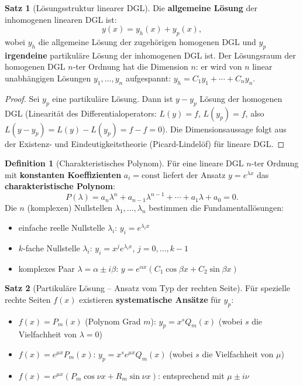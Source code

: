 ﻿\documentclass[a4paper,12pt]{report}
\theoremstyle{definition}
\newtheorem{definition}{Definition}
\newtheorem{satz}{Satz}
\begin{document}
\begin{satz}[L\"osungsstruktur linearer DGL]
Die \textbf{allgemeine L\"osung} der inhomogenen linearen DGL ist:
\[
  y(x) = y_h(x) + y_p(x),
\]
wobei $y_h$ die allgemeine L\"osung der zugeh\"origen homogenen DGL
und $y_p$ \textbf{irgendeine} partikul\"are L\"osung der inhomogenen DGL ist.
Der L\"osungsraum der homogenen DGL $n$-ter Ordnung hat die Dimension $n$:
er wird von $n$ linear unabh\"angigen L\"osungen $y_1, \ldots, y_n$ aufgespannt:
$y_h = C_1 y_1 + \cdots + C_n y_n$.
\end{satz}
\begin{proof}
Sei $y_p$ eine partikul\"are L\"osung. Dann ist $y - y_p$ L\"osung der
homogenen DGL (Linearit\"at des Differentialoperators: $L(y) = f$,
$L(y_p) = f$, also $L(y - y_p) = L(y) - L(y_p) = f - f = 0$).
Die Dimensionsaussage folgt aus der Existenz- und Eindeutigkeitstheorie
(Picard-Lindel\"of) f\"ur lineare DGL.
\end{proof}

\begin{definition}[Charakteristisches Polynom]
F\"ur eine lineare DGL $n$-ter Ordnung mit \textbf{konstanten Koeffizienten}
$a_i = \mathrm{const}$ liefert der Ansatz $y = e^{\lambda x}$
das \textbf{charakteristische Polynom}:
\[
  P(\lambda) = a_n\lambda^n + a_{n-1}\lambda^{n-1} + \cdots + a_1\lambda + a_0 = 0.
\]
Die $n$ (komplexen) Nullstellen $\lambda_1, \ldots, \lambda_n$ bestimmen die
Fundamentall\"osungen:
\begin{itemize}
    \item[-] einfache reelle Nullstelle $\lambda_i$: $y_i = e^{\lambda_i x}$
    \item[-] $k$-fache Nullstelle $\lambda_i$: $y_i = x^j e^{\lambda_i x}$, $j = 0, \ldots, k-1$
    \item[-] komplexes Paar $\lambda = \alpha \pm i\beta$: $y = e^{\alpha x}(C_1\cos\beta x + C_2\sin\beta x)$
\end{itemize}
\end{definition}

\begin{satz}[Partikuläre Lösung -- Ansatz vom Typ der rechten Seite]
F\"ur spezielle rechte Seiten $f(x)$ existieren \textbf{systematische Ans\"atze}
f\"ur $y_p$:
\begin{itemize}
    \item[-] $f(x) = P_m(x)$ (Polynom Grad $m$): $y_p = x^s Q_m(x)$ (wobei $s$ die Vielfachheit von $\lambda=0$)
    \item[-] $f(x) = e^{\mu x}P_m(x)$: $y_p = x^s e^{\mu x} Q_m(x)$ (wobei $s$ die Vielfachheit von $\mu$)
    \item[-] $f(x) = e^{\mu x}(P_m\cos\nu x + R_m\sin\nu x)$: entsprechend mit $\mu \pm i\nu$
\end{itemize}
\end{satz}
\end{document}
